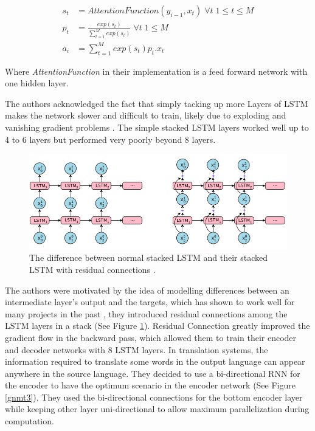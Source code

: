 \begin{align*}
    s_t &= AttentionFunction(y_{i-1},x_t)\;\forall t \;1\leq t\leq M\\
    p_t &= \frac{exp(s_t)}{\sum_{t=1}^M exp(s_t)}\;\forall t \;1\leq M\\
    a_i &= \sum_{t=1}^M exp(s_t) p_t.x_t
\end{align*}


Where \textit{AttentionFunction} in their implementation is a feed forward network with one hidden layer\citep{45610}.

The authors acknowledged the fact that simply tacking up more Layers of LSTM makes the network slower and difficult to train, likely due to exploding and vanishing gradient problems \citep{DBLP:journals/corr/NorouziBCJSWS16,Hochreiter01gradientflow}. The simple stacked LSTM layers worked well up to 4 to 6 layers but performed very poorly beyond 8 layers. 

\begin{figure}
\includegraphics[width=\textwidth]{figures/gnmt2.png}
\caption{The difference between normal stacked LSTM and their stacked LSTM with residual connections \citep{45610}.} \label{gnmt2}
\end{figure}

The authors were motivated by the idea of modelling differences between an intermediate layer’s output and the targets, which has shown to work well for many projects in the past \citep{NIPS1989_207,7780459,DBLP:journals/corr/SrivastavaGS15}, they introduced residual connections among the LSTM layers in a stack (See Figure \ref{gnmt2}). Residual Connection greatly improved the gradient flow in the backward pass, which allowed them to train their encoder and decoder networks with 8 LSTM layers. In translation systems, the information required to translate some words in the output language can appear anywhere in the source language. They decided to use a bi-directional RNN for the encoder to have the optimum scenario in the encoder network (See Figure \ref{gnmt3}). They used the bi-directional connections for the bottom encoder layer while keeping other layer uni-directional to allow maximum parallelization during computation. 

